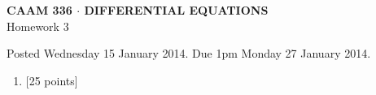 \documentclass[10pt]{article}
\begin{document}
\vspace*{-5em}
\begin{center}
\large \textsf{\textbf{CAAM 336 $\cdot$ DIFFERENTIAL EQUATIONS}\\[0.5em]
Homework 3 }
\end{center}

Posted Wednesday 15 January 2014.  Due 1pm Monday 27 January 2014.

\begin{enumerate}\addtocounter{enumi}{2}
\item {[25 points]} \\ 
\end{enumerate}
\end{document}
